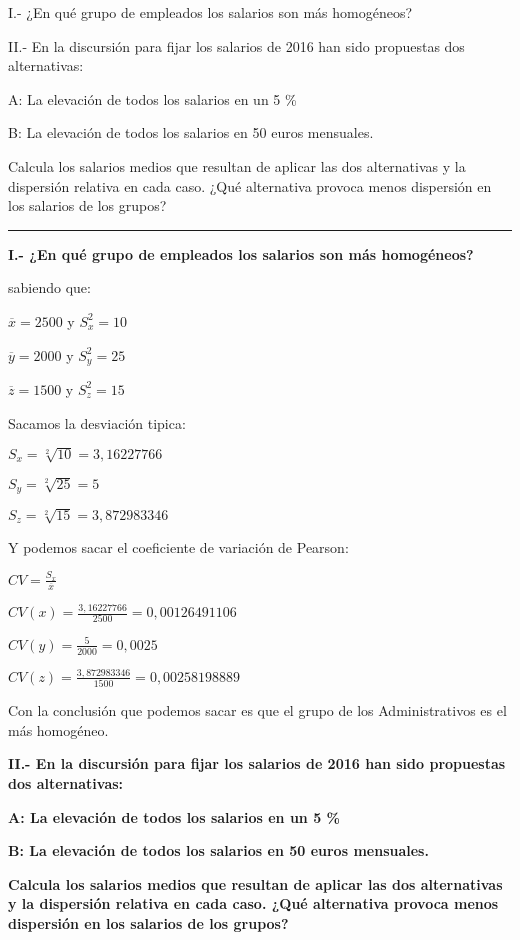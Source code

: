 \documentclass{article}
\begin{document}
I.- ¿En qu\'e grupo de empleados los salarios son m\'as homog\'eneos?

II.- En la discursi\'on para fijar los salarios de 2016 han sido propuestas dos alternativas:

	A: La elevaci\'on de todos los salarios en un 5 \%
	
	B: La elevaci\'on de todos los salarios en 50 euros mensuales.

Calcula los salarios medios que resultan de aplicar las dos alternativas y la dispersi\'on relativa en cada caso. ¿Qu\'e alternativa provoca menos dispersi\'on en los salarios de los grupos?

\rule{119mm}{0.2mm}

\textbf{I.- ¿En qu\'e grupo de empleados los salarios son m\'as homog\'eneos?}

sabiendo que:

\(\overline{x} = 2500\) y \( S_{x}^2 = 10\)

\(\overline{y} = 2000\) y \(S_{y}^2 = 25\)

\(\overline{z} = 1500\) y \(S_{z}^2 = 15\)


Sacamos la desviaci\'on tipica:

\(S_{x} = \sqrt[2]{10} = 3,16227766\)

\(S_{y} = \sqrt[2]{25} = 5\)

\(S_{z} = \sqrt[2]{15} = 3,872983346\)

Y podemos sacar el coeficiente de variaci\'on de Pearson:

\(CV = \frac{S_{x}}{\overline{x}}\)

\(CV(x) = \frac{3,16227766}{2500} = 0,00126491106\) 

\(CV(y) = \frac{5}{2000} = 0,0025\) 

\(CV(z) = \frac{3,872983346}{1500} = 0,00258198889\)  

Con la conclusi\'on que podemos sacar es que el grupo de los Administrativos es el m\'as homog\'eneo.

\textbf{II.- En la discursi\'on para fijar los salarios de 2016 han sido propuestas dos alternativas:}

	\textbf{A: La elevaci\'on de todos los salarios en un 5 \%}
	
	\textbf{B: La elevaci\'on de todos los salarios en 50 euros mensuales.}

\textbf{Calcula los salarios medios que resultan de aplicar las dos alternativas y la dispersi\'on relativa en cada caso. ¿Qu\'e alternativa provoca menos dispersi\'on en los salarios de los grupos?}
\end{document}

